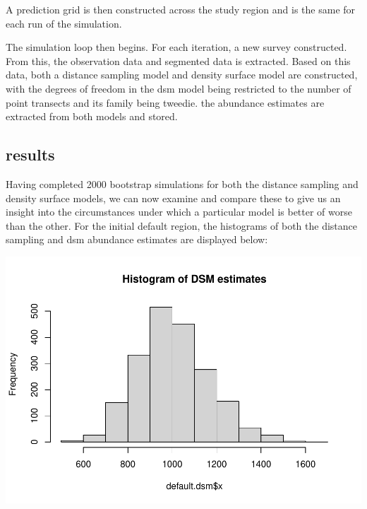 \documentclass[
]{article}
\newenvironment{Shaded}{\begin{snugshade}}{\end{snugshade}}
\newcommand{\AttributeTok}[1]{\textcolor[rgb]{0.77,0.63,0.00}{#1}}
\newcommand{\FunctionTok}[1]{\textcolor[rgb]{0.00,0.00,0.00}{#1}}
\newcommand{\NormalTok}[1]{#1}
\newcommand{\OtherTok}[1]{\textcolor[rgb]{0.56,0.35,0.01}{#1}}
\newcommand{\SpecialCharTok}[1]{\textcolor[rgb]{0.00,0.00,0.00}{#1}}
\newcommand{\StringTok}[1]{\textcolor[rgb]{0.31,0.60,0.02}{#1}}
\begin{document}
A prediction grid is then constructed across the study region and is the
same for each run of the simulation.

The simulation loop then begins. For each iteration, a new survey
constructed. From this, the observation data and segmented data is
extracted. Based on this data, both a distance sampling model and
density surface model are constructed, with the degrees of freedom in
the dsm model being restricted to the number of point transects and its
family being tweedie. the abundance estimates are extracted from both
models and stored.

\hypertarget{results}{%
\subsection{results}\label{results}}

Having completed 2000 bootstrap simulations for both the distance
sampling and density surface models, we can now examine and compare
these to give us an insight into the circumstances under which a
particular model is better of worse than the other. For the initial
default region, the histograms of both the distance sampling and dsm
abundance estimates are displayed below:

\begin{Shaded}
\end{Shaded}

\includegraphics{project-report_files/figure-latex/unnamed-chunk-2-1.pdf}
\end{document}
